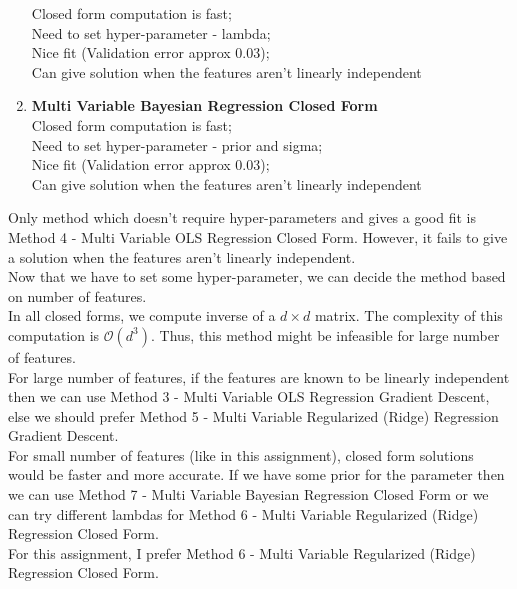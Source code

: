 \documentclass[12pt, fleqn]{article}
\begin{document}
\begin{enumerate}
        Closed form computation is fast; \\
        Need to set hyper-parameter - lambda; \\
        Nice fit (Validation error approx 0.03); \\
        Can give solution when the features aren't linearly independent
  \item \textbf{Multi Variable Bayesian Regression Closed Form} \\
        Closed form computation is fast; \\
        Need to set hyper-parameter - prior and sigma; \\
        Nice fit (Validation error approx 0.03); \\
        Can give solution when the features aren't linearly independent
\end{enumerate}

Only method which doesn't require hyper-parameters and gives a good fit is Method 4 - Multi Variable OLS Regression Closed Form. However, it fails to give a solution when the features aren't linearly independent. \\

Now that we have to set some hyper-parameter, we can decide the method based on number of features. \\
In all closed forms, we compute inverse of a $d \times d$ matrix. The complexity of this computation is $\mathcal{O}(d^3)$. Thus, this method might be infeasible for large number of features. \\

For large number of features, if the features are known to be linearly independent then we can use Method 3 - Multi Variable OLS Regression Gradient Descent, else we should prefer Method 5 - Multi Variable Regularized (Ridge) Regression Gradient Descent. \\

For small number of features (like in this assignment), closed form solutions would be faster and more accurate. If we have some prior for the parameter then we can use Method 7 - Multi Variable Bayesian Regression Closed Form or we can try different lambdas for Method 6 - Multi Variable Regularized (Ridge) Regression Closed Form. \\

For this assignment, I prefer Method 6 - Multi Variable Regularized (Ridge) Regression Closed Form.
\end{document}

